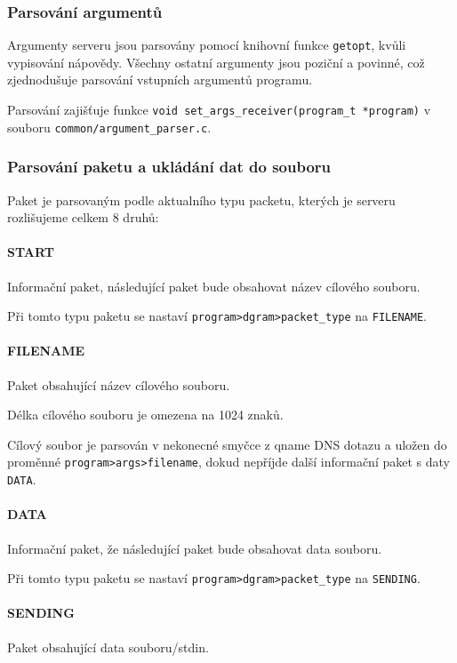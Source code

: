 \subsubsection{Parsování argumentů} \label{sec:parsovani-argumentu-s}
Argumenty serveru jsou parsovány pomocí knihovní funkce \texttt{getopt},
kvůli
vypisování nápovědy. Všechny ostatní argumenty jsou poziční a povinné,
což zjednodušuje parsování vstupních argumentů programu.

Parsování zajišťuje funkce \texttt{void set\_args\_receiver(program\_t *program)}
v souboru \texttt{common/argument\_parser.c}.

\subsubsection{Parsování paketu a ukládání dat do souboru} \label{sec:vytvareni-paketu-s}
Paket je parsovaným podle aktualního typu packetu, kterých je serveru
rozlišujeme celkem 8 druhů:

\paragraph{START}
Informační paket, následující paket bude obsahovat název cílového souboru.

Při tomto typu paketu se nastaví \texttt{program\->dgram\->packet\_type} na \texttt{FILENAME}.

\paragraph{FILENAME}
Paket obsahující název cílového souboru.

Délka cílového souboru je omezena na 1024 znaků.

Cílový soubor je parsován v nekonecné smyčce z qname DNS dotazu
a uložen do proměnné \texttt{program\->args\->filename}, dokud nepříjde
další informační paket s daty \texttt{DATA}.

\paragraph{DATA}
Informační paket, že následující paket bude obsahovat data souboru.

Při tomto typu paketu se nastaví \texttt{program\->dgram\->packet\_type} na \texttt{SENDING}.

\paragraph{SENDING}
Paket obsahující data souboru/stdin.

